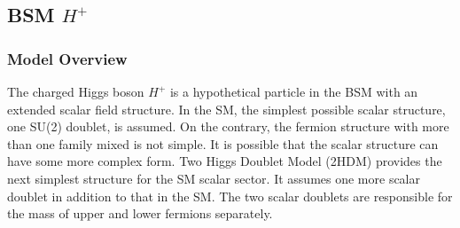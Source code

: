 








\subsection{BSM $H^+$}
\label{sec:relatedWorks:bsm:chargedHiggs}

\subsubsection{Model Overview}
The charged Higgs boson $H^+$ is a hypothetical particle in the BSM with an extended scalar field structure. In the SM, the simplest possible scalar structure, one SU(2) doublet, is assumed. On the contrary, the fermion structure with more than one family mixed is not simple. It is possible that the scalar structure can have some more complex form. Two Higgs Doublet Model (2HDM) provides the next simplest structure for the SM scalar sector. It assumes one more scalar doublet in addition to that in the SM. The two scalar doublets are responsible for the mass of upper and lower fermions separately. 

